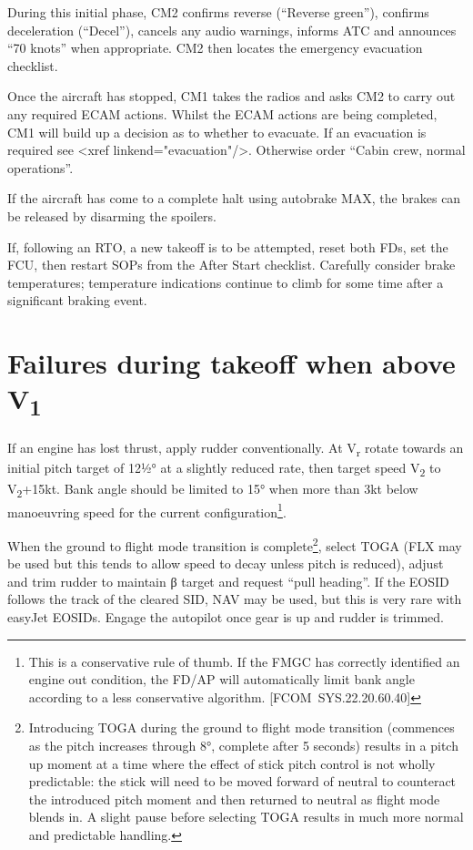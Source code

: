 \documentclass[a5paper,11pt,twoside]{book}
\newcommand{\multicite}[1]{
  \nopagebreak
  \noindent{\footnotesize\color{blue}{[ #1 ]}}
}
\newcommand{\V}[1]{V\textsubscript{#1}}
\begin{document}
During this initial phase, CM2 confirms reverse (“Reverse green”), confirms
deceleration (“Decel”), cancels any audio warnings, informs ATC and announces
“70 knots” when appropriate. CM2 then locates the emergency evacuation
checklist.

Once the aircraft has stopped, CM1 takes the radios and asks CM2 to carry out
any required ECAM actions. Whilst the ECAM actions are being completed, CM1 will
build up a decision as to whether to evacuate. If an evacuation is required see
<xref linkend="evacuation"/>. Otherwise order “Cabin crew, normal operations”.

If the aircraft has come to a complete halt using autobrake MAX, the brakes can
be released by disarming the spoilers.

If, following an RTO, a new takeoff is to be attempted, reset both FDs, set the
FCU, then restart SOPs from the After Start checklist. Carefully consider brake
temperatures; temperature indications continue to climb for some time after a
significant braking event.

\multicite{EOMB 3.10, FCTM PRO.AEP.MISC}


\section{Failures during takeoff when above \V{1}}

If an engine has lost thrust, apply rudder conventionally. At V\textsubscript{r}
rotate towards an initial pitch target of 12½° at a slightly reduced rate, then
target speed \V{2} to \V{2}+15kt. Bank angle should be limited to 15° when more
than 3kt below manoeuvring speed for the current configuration\footnote{This is
a conservative rule of thumb. If the FMGC has correctly identified an engine out
condition, the FD/AP will automatically limit bank angle according to a less
conservative algorithm. [FCOM SYS.22.20.60.40]}.

When the ground to flight mode transition is complete\footnote{Introducing TOGA
during the ground to flight mode transition (commences as the pitch increases
through 8°, complete after 5 seconds) results in a pitch up moment at a time
where the effect of stick pitch control is not wholly predictable: the stick
will need to be moved forward of neutral to counteract the introduced pitch
moment and then returned to neutral as flight mode blends in. A slight pause
before selecting TOGA results in much more normal and predictable handling.},
select TOGA (FLX may be used but this tends to allow speed to decay unless pitch
is reduced), adjust and trim rudder to maintain β target and request “pull
heading”. If the EOSID follows the track of the cleared SID, NAV may be used,
but this is very rare with easyJet EOSIDs.  Engage the autopilot once gear is up
and rudder is trimmed.
\end{document}
